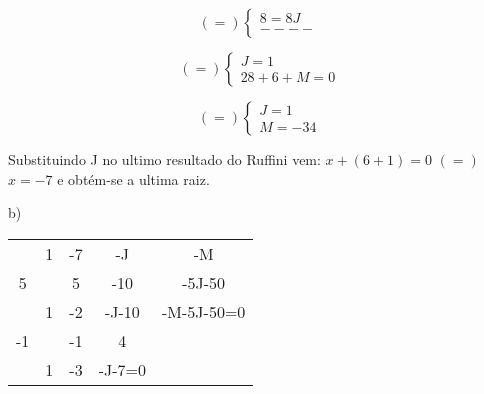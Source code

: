 \documentclass[11pt]{article}
\begin{document}
\begin{minipage}{0.3\textwidth}
	\[(=)\left\{
		\begin{array}{lr}
    		8=8J\\
    		----
  		\end{array}
	\right.
	\]
\end{minipage}%
\begin{minipage}{0.3\textwidth}
	\[(=)\left\{
		\begin{array}{lr}
    		J=1\\
    		28+6+M=0
  		\end{array}
	\right.
	\]					
\end{minipage}
\begin{minipage}{0.3\textwidth}
	\[(=)\left\{
		\begin{array}{lr}
    		J=1\\
    		M=-34
  		\end{array}
	\right.
	\]			
\end{minipage}

\vspace{5mm}
Substituindo J no ultimo resultado do Ruffini vem:
$x + (6 +1) = 0$ \hspace{1mm} $(=)$ \hspace{1mm} $x = -7$
e obtém-se a ultima raiz.
\vspace{5mm}

b)
\begin{table}[htbp]
\centering
\label{my-label}
\begin{tabular}{c|cccc}
   & 1 & -7                      & -J                         & -M         \\
5  &   & 5                       & -10                        & -5J-50     \\ \hline
   & 1 & -2                      & \multicolumn{1}{c|}{-J-10} & -M-5J-50=0 \\ \cline{5-5} 
-1 &   & -1                      & 4                          &            \\ \cline{1-4}
   & 1 & \multicolumn{1}{c|}{-3} & -J-7=0                     &            \\ \cline{4-4}
\end{tabular}
\end{table}
\break
\end{document}
